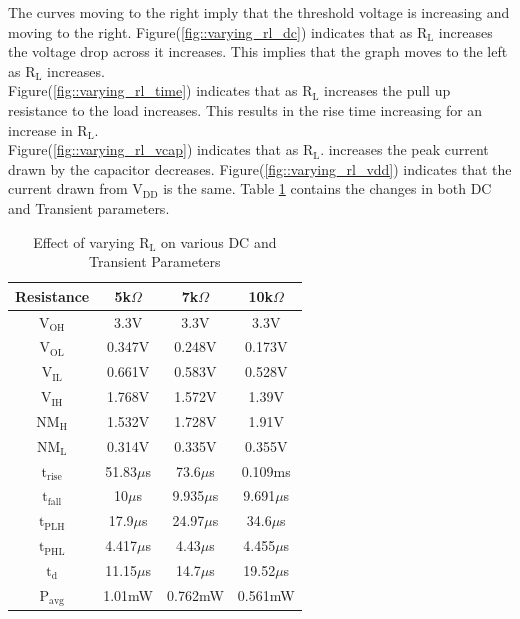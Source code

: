 \documentclass[12pt]{article}
\begin{document}
    The curves moving to the right imply that the threshold voltage is increasing and moving to the right. Figure(\ref{fig::varying_rl_dc}) indicates that as $\text{R}_\text{L}$ increases the voltage drop across it increases. This implies that the graph moves to the left as $\text{R}_\text{L}$ increases.\\
    Figure(\ref{fig::varying_rl_time}) indicates that as $\text{R}_\text{L}$ increases the pull up resistance to the load increases. This results in the rise time increasing for an increase in $\text{R}_\text{L}$.\\
    Figure(\ref{fig::varying_rl_vcap}) indicates that as $\text{R}_\text{L}$. increases the peak current drawn by the capacitor decreases. Figure(\ref{fig::varying_rl_vdd}) indicates that the current drawn from $\text{V}_{\text{DD}}$ is the same. Table \ref{table::tablevaryrl} contains the changes in both DC and Transient parameters.
    \begin{table}[H]
    \begin{center}
    \begin{tabular}{|c|c|c|c|}
    	\hline 
    	\rule[-1ex]{0pt}{2.5ex} Resistance & 5k$\Omega$ & 7k$\Omega$ & 10k$\Omega$  \\ 
    	\hline 
    	\rule[-1ex]{0pt}{2.5ex} $\text{V}_\text{OH}$ & 3.3V & 3.3V & 3.3V \\ 
    	$\text{V}_\text{OL}$ & 0.347V & 0.248V & 0.173V \\ 
    	$\text{V}_\text{IL}$ & 0.661V & 0.583V & 0.528V \\ 
    	 $\text{V}_\text{IH}$ & 1.768V & 1.572V & 1.39V \\ 
    	$\text{NM}_\text{H}$ & 1.532V & 1.728V & 1.91V \\ 
    	 $\text{NM}_\text{L}$ & 0.314V & 0.335V & 0.355V \\ 
    	$\text{t}_\text{rise}$ & 51.83$\mu$s & 73.6$\mu$s & 0.109ms \\ 
    	$\text{t}_\text{fall}$ & 10$\mu$s & 9.935$\mu$s & 9.691$\mu$s \\ 
    	$\text{t}_\text{PLH}$ & 17.9$\mu$s & 24.97$\mu$s & 34.6$\mu$s \\ 
    	$\text{t}_\text{PHL}$ & 4.417$\mu$s & 4.43$\mu$s & 4.455$\mu$s \\ 
    	$\text{t}_\text{d}$ & 11.15$\mu$s & 14.7$\mu$s & 19.52$\mu$s \\ 
    	$\text{P}_\text{avg}$ & 1.01mW  & 0.762mW & 0.561mW \\ 
    	\hline 
    \end{tabular} 
	\end{center}
	\caption{Effect of varying $\text{R}_\text{L}$ on various DC and Transient Parameters}
	\label{table::tablevaryrl}
	\end{table}
\end{document}
